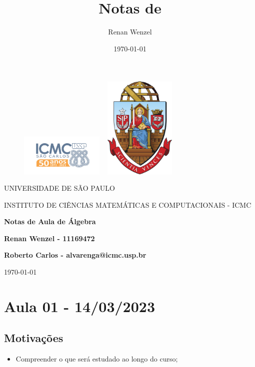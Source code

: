 \documentclass{article}
\title{Notas de }
\author{Renan Wenzel}
\date{\today}
\begin{document}
 \begin{figure}[ht]
		\includegraphics[width=4cm]{../icmc.png}
		\hspace{7cm}
		\includegraphics[height=4.9cm,width=4cm]{../brasao_usp_cor.jpg}
	\endminipage	
\end{figure}

\begin{center}
	\vspace{1cm}
	\LARGE
	UNIVERSIDADE DE S\~AO PAULO

	\vspace{1.3cm}
	\LARGE
	INSTITUTO DE CI\^ENCIAS MATEM\'ATICAS E COMPUTACIONAIS - ICMC

	\vspace{1.7cm}
	\Large
	\textbf{Notas de Aula de \'Algebra}

	\vspace{1.3cm}
	\large
	\textbf{Renan Wenzel - 11169472}

	\vspace{1.3cm}
	\large
	\textbf{Roberto Carlos - alvarenga@icmc.usp.br}

	\vspace{1.3cm}
	\today
\end{center}

 \newpage

 \tableofcontents

 \newpage

\section{Aula 01 - 14/03/2023}
\subsection{Motiva\c c\~oes}
\begin{itemize}
  \item Compreender o que ser\'a estudado ao longo do curso;
\end{itemize}
\end{document}
